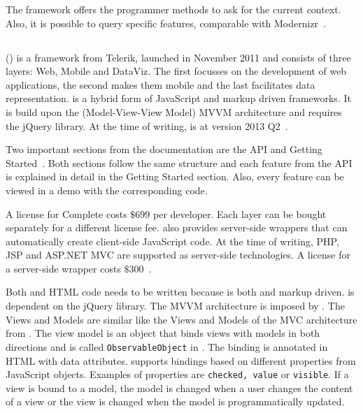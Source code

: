 \documentclass[a4paper]{artikel3}
\newcommand{\code}[1]{\texttt{#1}}
\newcommand{\setspace}[0]{\vspace{2mm}}
\renewcommand{\paragraph}[1]{\setspace \noindent {\bf #1}  }
\begin{document}
The framework offers the programmer methods to ask for the current context.
Also,  it is possible to query specific features,  comparable with Modernizr~\cite{Modernizr2012}.  


\subsection{\kendo} %
\label{sec:frameworks-kendo}

\kendo{} (\kendoa{}) is a framework from Telerik,  launched in November 2011 and consists of three layers:  Web,  Mobile and DataViz.
The first focusses on the development of web applications,  the second makes them mobile and the last facilitates data representation.
\kendoa{} is a hybrid form of JavaScript and markup driven frameworks.
It is build upon the (Model-View-View Model) MVVM architecture and requires the jQuery library.
At the time of writing,  \kendoa{} is at version 2013 Q2~\cite{Telerike}. 

\paragraph{Documentation}
Two important sections from the documentation are the API and Getting Started~\cite{Telerikd}.
Both sections follow the same structure and each feature from the API is explained in detail in the Getting Started section.
Also,  every feature can be viewed in a demo with the corresponding code.

\paragraph{License}
A license for \kendoa{} Complete costs $\$699$ per developer.
Each layer can be bought separately for a different license fee.
\kendoa{} also provides server-side wrappers that can automatically create client-side JavaScript code.
At the time of writing, PHP,  JSP and ASP.NET MVC are supported as server-side technologies.
A license for a server-side wrapper costs $\$300$~\cite{Telerike}.

\paragraph{Code and development}
Both \js{} and HTML code needs to be written because \kendo{} is both \js{} and markup driven.
\kendo{} is dependent on the jQuery library.
The MVVM architecture is imposed by \kendoa{}.
The Views and Models are similar like the Views and Models of the MVC architecture from \sta{}.
The view model is an object that binds views with models in both directions and is called \code{ObservableObject} in \kendoa{}.
The binding is annotated in HTML with data attributes.
\kendoa{} supports bindings based on different properties from JavaScript objects.
Examples of properties are \code{checked,  value} or \code{visible}.
If a view is bound to a model,  the model is changed when a user changes the content of a view or the view is changed when the model is programmatically updated.
\end{document}
